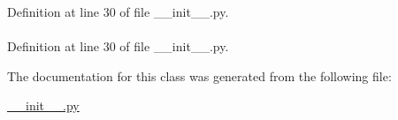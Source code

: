 \-Definition at line 30 of file \-\_\-\-\_\-init\-\_\-\-\_\-.\-py.

\hypertarget{classforcebalance_1_1BaseClass_afd68efa29ccd2f320f4cf82198214aac}{
\paragraph[{verbose\-\_\-options}]{}}\label{classforcebalance_1_1BaseClass_afd68efa29ccd2f320f4cf82198214aac}


\-Definition at line 30 of file \-\_\-\-\_\-init\-\_\-\-\_\-.\-py.



\-The documentation for this class was generated from the following file\-:\begin{DoxyCompactItemize}
\item 
\hyperlink{____init_____8py}{\-\_\-\-\_\-init\-\_\-\-\_\-.\-py}\end{DoxyCompactItemize}
